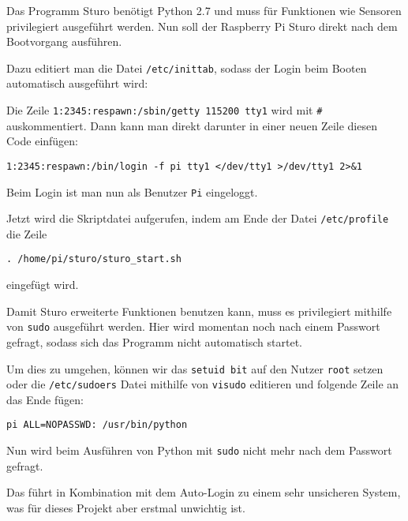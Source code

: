 \documentclass[a4paper,10pt]{scrartcl}
\begin{document}
    Das Programm Sturo benötigt Python 2.7 und muss für Funktionen wie Sensoren privilegiert
    ausgeführt werden.
    Nun soll der Raspberry Pi Sturo direkt nach dem Bootvorgang ausführen.

    Dazu editiert man die Datei \lstinline{/etc/inittab}, sodass der Login beim Booten automatisch
    ausgeführt wird:
    
    Die Zeile \lstinline{1:2345:respawn:/sbin/getty 115200 tty1} wird mit \lstinline{#}
    auskommentiert.
    Dann kann man direkt darunter in einer neuen Zeile diesen Code einfügen:
    \begin{lstlisting}
1:2345:respawn:/bin/login -f pi tty1 </dev/tty1 >/dev/tty1 2>&1
    \end{lstlisting}
    Beim Login ist man nun als Benutzer \lstinline{Pi} eingeloggt.

    Jetzt wird die Skriptdatei aufgerufen, indem am Ende der Datei \lstinline{/etc/profile} die
    Zeile
    \begin{lstlisting}
. /home/pi/sturo/sturo_start.sh
    \end{lstlisting}
    eingefügt wird.

    Damit Sturo erweiterte Funktionen benutzen kann, muss es privilegiert mithilfe von
    \lstinline{sudo} ausgeführt werden.
    Hier wird momentan noch nach einem Passwort gefragt, sodass sich das Programm nicht automatisch
    startet.

    Um dies zu umgehen, können wir das \lstinline{setuid bit} auf den Nutzer \lstinline{root} setzen
    oder die \lstinline{/etc/sudoers} Datei mithilfe von \lstinline{visudo} editieren und folgende
    Zeile an das Ende fügen:
    \begin{lstlisting}
pi ALL=NOPASSWD: /usr/bin/python
    \end{lstlisting}

    Nun wird beim Ausführen von Python mit \lstinline{sudo} nicht mehr nach dem Passwort gefragt.

    Das führt in Kombination mit dem Auto-Login zu einem sehr unsicheren System, was für dieses
    Projekt aber erstmal unwichtig ist.
\end{document}
